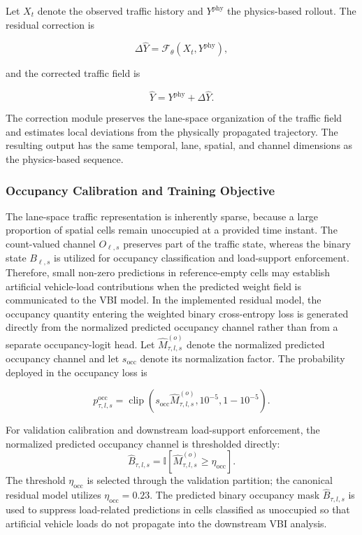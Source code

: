 \documentclass[journal]{IEEEtran}
\begin{document}
Let $X_t$ denote the observed traffic history and $Y^{\mathrm{phy}}$ the physics-based rollout. The residual correction is

\begin{equation}
\Delta\widehat{Y}
=
\mathcal{F}_{\theta}
\left(
X_t,
Y^{\mathrm{phy}}
\right),
\end{equation}

and the corrected traffic field is

\begin{equation}
\widehat{Y}
=
Y^{\mathrm{phy}}
+
\Delta\widehat{Y}.
\end{equation}

The correction module preserves the lane-space organization of the traffic field and estimates local deviations from the physically propagated trajectory. The resulting output has the same temporal, lane, spatial, and channel dimensions as the physics-based sequence.


\subsubsection{Occupancy Calibration and Training Objective}
\label{sec:occupancy_training}

The lane-space traffic representation is inherently sparse, because a large proportion of spatial cells remain unoccupied at a provided time instant. The count-valued channel $O_{\ell,s}$ preserves part of the traffic state, whereas the binary state $B_{\ell,s}$ is utilized for occupancy classification and load-support enforcement. Therefore, small non-zero predictions in reference-empty cells may establish artificial vehicle-load contributions when the predicted weight field is communicated to the VBI model. In the implemented residual model, the occupancy quantity entering the weighted binary cross-entropy loss is generated directly from the normalized predicted occupancy channel rather than from a separate occupancy-logit head. Let $\widehat{M}_{\tau,l,s}^{(o)}$ denote the normalized predicted occupancy channel and let $s_{\mathrm{occ}}$ denote its normalization factor. The probability deployed in the occupancy loss is

\begin{equation}
p_{\tau,l,s}^{\mathrm{occ}}
=
\operatorname{clip}
\left(
s_{\mathrm{occ}}\widehat{M}_{\tau,l,s}^{(o)},
10^{-5},
1-10^{-5}
\right).
\end{equation}



For validation calibration and downstream load-support enforcement, the normalized predicted occupancy channel is thresholded directly:
\begin{equation}
\widehat{B}_{\tau,l,s}
=
\mathbb{I}\left[
\widehat{M}_{\tau,l,s}^{(o)}
\geq \eta_{\mathrm{occ}}
\right].
\label{eq:predicted_binary_occupancy}
\end{equation}
The threshold $\eta_{\mathrm{occ}}$ is selected through the validation partition; the canonical residual model utilizes $\eta_{\mathrm{occ}}=0.23$. The predicted binary occupancy mask \(\hat B_{\tau,l,s}\) is used to suppress load-related predictions in cells classified as unoccupied so that artificial vehicle loads do not propagate into the downstream VBI analysis.
\end{document}
